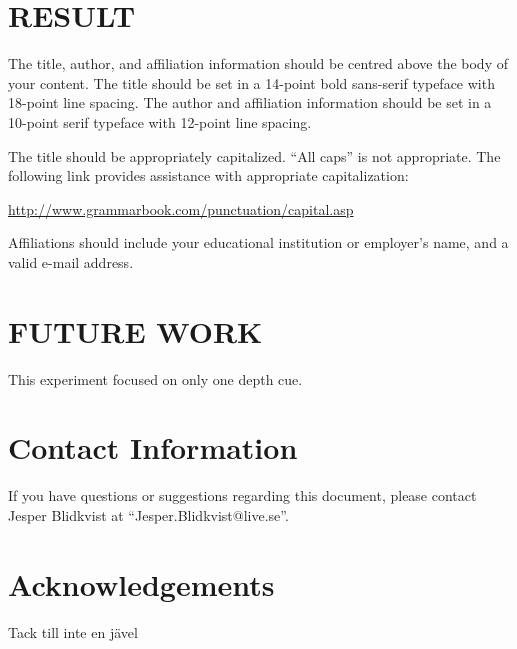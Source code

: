 \documentclass[tog]{acmsiggraph}
\begin{document}
\section{RESULT}

The title, author, and affiliation information should be centred
above the body of your content. The title should be set in a 14-point
bold sans-serif typeface with 18-point line spacing. The author and
affiliation information should be set in a 10-point serif typeface
with 12-point line spacing.

The title should be appropriately capitalized. ``All caps'' is not
appropriate. The following link provides assistance with appropriate
capitalization:

{\small\url{http://www.grammarbook.com/punctuation/capital.asp}}

Affiliations should include your educational institution or employer's
name, and a valid e-mail address.

\section{FUTURE WORK}

This experiment focused on only one depth cue. 




\section{Contact Information}

If you have questions or suggestions regarding this document, please
contact Jesper Blidkvist at ``Jesper.Blidkvist@live.se''.

\section*{Acknowledgements}

Tack till inte en jävel


\nocite{*}

\end{document}
